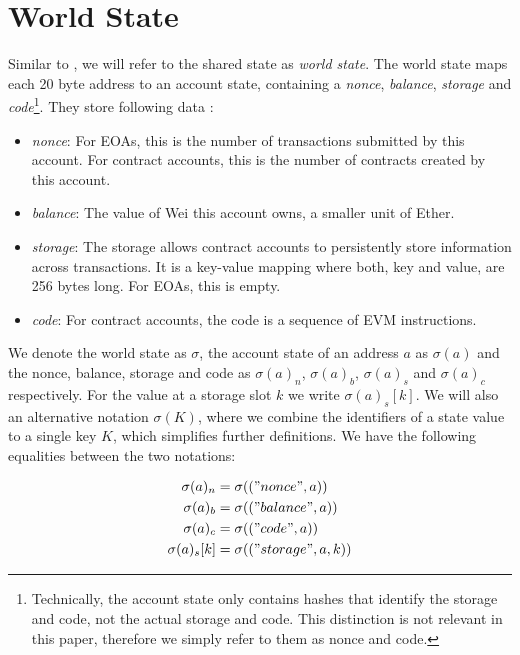 \documentclass[draft,final]{vutinfth} %
\begin{document}
\section{World State}

Similar to \cite[p.3]{wood_ethereum_2024}, we will refer to the shared state as \emph{world state}. The world state maps each 20 byte address to an account state, containing a \emph{nonce}, \emph{balance}, \emph{storage} and \emph{code}\footnote{Technically, the account state only contains hashes that identify the storage and code, not the actual storage and code. This distinction is not relevant in this paper, therefore we simply refer to them as nonce and code.}. They store following data \cite[p.4]{wood_ethereum_2024}:

\begin{itemize}
    \item \emph{nonce}: For EOAs, this is the number of transactions submitted by this account. For contract accounts, this is the number of contracts created by this account.
    \item \emph{balance}: The value of Wei this account owns, a smaller unit of Ether.
    \item \emph{storage}: The storage allows contract accounts to persistently store information across transactions. It is a key-value mapping where both, key and value, are 256 bytes long. For EOAs, this is empty.
    \item \emph{code}: For contract accounts, the code is a sequence of EVM instructions.
\end{itemize}

We denote the world state as $\sigma$, the account state of an address $a$ as $\sigma(a)$ and the nonce, balance, storage and code as $\sigma(a)_n$, $\sigma(a)_b$, $\sigma(a)_s$ and $\sigma(a)_c$ respectively. For the value at a storage slot $k$ we write $\sigma(a)_s[k]$. We will also an alternative notation $\sigma(K)$, where we combine the identifiers of a state value to a single key $K$, which simplifies further definitions. We have the following equalities between the two notations:

\begin{align*}
    \sigma(a)_n    & = \sigma(("nonce", a))      \\
    \sigma(a)_b    & = \sigma(("balance", a))    \\
    \sigma(a)_c    & = \sigma(("code", a))       \\
    \sigma(a)_s[k] & = \sigma(("storage", a, k)) \\
\end{align*}
\end{document}
